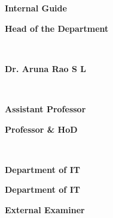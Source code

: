 \documentclass[a4paper,12pt, English]{article}
\begin{document}
\begin{titlepage}
\noindent
{\begin{normalsize}
{\textbf{Internal Guide}}
\end{normalsize}
}
\hfill
{\begin{normalsize}
{\textbf{Head of the Department}}
\end{normalsize}
}\\
\noindent
{\begin{normalsize}
{\textbf{Ms. M. Sudha Rani}}}
\end{normalsize}
}
\hspace{8.5cm}
{\begin{normalsize}
{\textbf{Dr. Aruna Rao S L}}
\end{normalsize}
}\\
\noindent
{\begin{normalsize}
{\textbf{Assistant Professor}}
\end{normalsize}
}
\hspace{8.43cm}
{
\begin{normalsize}
\textbf{Professor \& HoD}
\end{normalsize}
}\\
\hspace{9cm}
\noindent
{\begin{normalsize}
{\textbf{Department of IT}}
\end{normalsize}
}
\hspace{8.65cm}
{
\begin{normalsize}
{\textbf{Department of IT}}
\end{normalsize}
}
\vspace*{0.4in}
\begin{center}
{\textbf{\large External Examiner}}
\end{center}




\end{titlepage}
\end{document}
